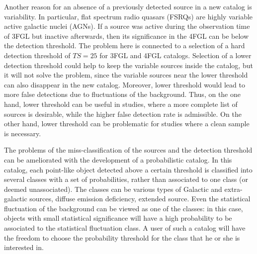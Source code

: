 Another reason for an absence of a previously detected source in a new catalog is variability.
In particular, flat spectrum radio quasars (FSRQs) are highly variable active galactic nuclei (AGNs).
If a source was active during the observation time of 3FGL but inactive afterwards, 
then its significance in the 4FGL can be below the detection threshold.
The problem here is connected to a selection of a hard detection threshold of $TS = 25$ for 3FGL and 4FGL catalogs.
Selection of a lower detection threshold could help to keep the variable sources inside the catalog, 
but it will not solve the problem, since the variable sources near the lower threshold can also disappear in the new catalog.
Moreover, lower threshold would lead to more false detections due to fluctuations of the background.
Thus, on the one hand, lower threshold can be useful in studies, where a more complete list of sources is desirable,
while the higher false detection rate is admissible. On the other hand, lower threshold can be problematic for studies where 
a clean sample is necessary. 

The problems of the miss-classification of the sources and the detection threshold can be ameliorated
with the development of a probabilistic catalog.
In this catalog, each point-like object detected above a certain threshold
is classified into several classes with a set of probabilities, rather than associated to one class (or deemed unassociated).
The classes can be various types of Galactic and extra-galactic sources, diffuse emission deficiency, extended source.
Even the statistical fluctuation of the background can be viewed as one of the classes: in this case, objects with small statistical significance
will have a high probability to be associated to the statistical fluctuation class.
A user of such a catalog will have the freedom to choose the probability threshold for the class that he or she is interested in.








